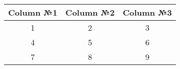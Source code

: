 
\begin{tabular}{|c|c|c|}
\hline
Column №1 & Column №2 & Column №3 \\
\hline
1 & 2 & 3 \\
\hline
4 & 5 & 6 \\
\hline
7 & 8 & 9 \\
\hline
\end{tabular}
